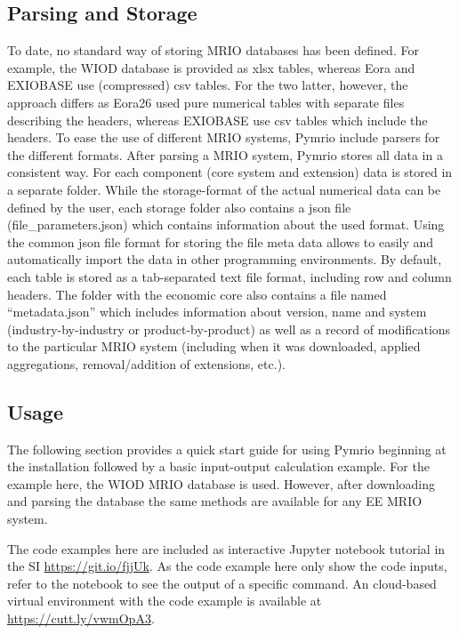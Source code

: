 \documentclass{jors}
\begin{document}
\subsection*{Parsing and Storage}

To date, no standard way of storing MRIO databases has been defined.
For example, the WIOD database \cite{timmer2015_Illustrated} is provided as xlsx tables, whereas Eora \cite{lenzen2013_Building} and EXIOBASE \cite{stadler2018_EXIOBASE} use (compressed) csv tables.
For the two latter, however, the approach differs as Eora26 used pure numerical tables with separate files describing the headers, whereas EXIOBASE use csv tables which include the headers.
To ease the use of different MRIO systems, Pymrio include parsers for the different formats.
After parsing a MRIO system, Pymrio stores all data in a consistent way.
For each component (core system and extension) data is stored in a separate folder.
While the storage-format of the actual numerical data can be defined by the user, each storage folder also contains a json file (file\_parameters.json) which contains information about the used format. 
Using the common json file format for storing the file meta data  allows to easily and automatically import the data in other programming environments. 
By default, each table is stored as a tab-separated text file format, including row and column headers.
The folder with the economic core also contains a file named ``metadata.json'' which includes information about version, name and system (industry-by-industry or product-by-product) as well as a record of modifications to the particular MRIO system (including when it was downloaded, applied aggregations, removal/addition of extensions, etc.). 

\subsection*{Usage}

The following section provides a quick start guide for using Pymrio beginning at the installation followed by a basic input-output calculation example.
For the example here, the WIOD MRIO database \cite{timmer2015_Illustrated} is used. 
However, after downloading and parsing the database the same methods are available for any EE MRIO system.

The code examples here are included as interactive Jupyter notebook tutorial in the SI \url{https://git.io/fjjUk}.
As the code example here only show the code inputs, refer to the notebook to see the output of a specific command. 
An cloud-based virtual environment with the code example is available at \url{https://cutt.ly/vwmOpA3}. 
\end{document}
